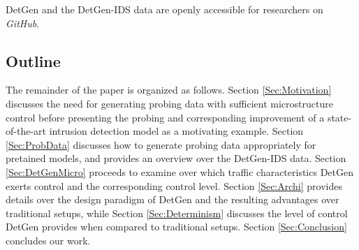 %
%
%
%
%
%


DetGen and the DetGen-IDS data are openly accessible for researchers on \textit{GitHub}.


\subsection{Outline}

The remainder of the paper is organized as follows. Section \ref{Sec:Motivation} discusses the need for generating probing data with sufficient microstructure control before presenting the probing and corresponding improvement of a state-of-the-art intrusion detection model as a motivating example. Section \ref{Sec:ProbData} discusses how to generate probing data appropriately for pretained models, and provides an overview over the DetGen-IDS data.
Section \ref{Sec:DetGenMicro} proceeds to examine over which traffic characteristics DetGen exerts control and the corresponding control level.
Section \ref{Sec:Archi} provides details over the design paradigm of DetGen and the resulting advantages over traditional setups, while Section \ref{Sec:Determinism} discusses the level of control DetGen provides when compared to traditional setups.
 Section \ref{Sec:Conclusion} concludes our work.

